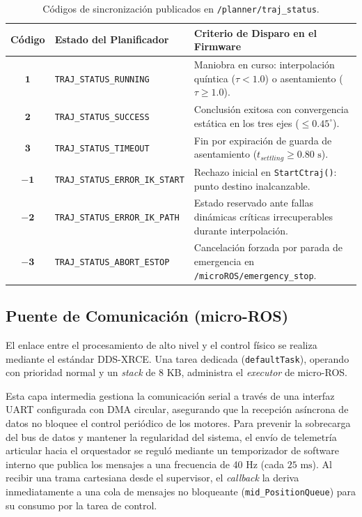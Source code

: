 \documentclass[12pt, a4paper]{report}
\begin{document}
\begin{table}[H]
\centering
\small
\begin{tabularx}{\linewidth}{|c|l|X|}
\hline
\textbf{Código} & \textbf{Estado del Planificador} & \textbf{Criterio de Disparo en el Firmware} \\
\hline
$\mathbf{1}$ & \texttt{TRAJ\_STATUS\_RUNNING} & Maniobra en curso: interpolación quíntica ($\tau < 1.0$) o asentamiento ($\tau \ge 1.0$). \\
\hline
$\mathbf{2}$ & \texttt{TRAJ\_STATUS\_SUCCESS} & Conclusión exitosa con convergencia estática en los tres ejes ($\le 0.45^\circ$). \\
\hline
$\mathbf{3}$ & \texttt{TRAJ\_STATUS\_TIMEOUT} & Fin por expiración de guarda de asentamiento ($t_{settling} \ge 0.80\text{ s}$). \\
\hline
$\mathbf{-1}$ & \texttt{TRAJ\_STATUS\_ERROR\_IK\_START} & Rechazo inicial en \texttt{StartCtraj()}: punto destino inalcanzable. \\
\hline
$\mathbf{-2}$ & \texttt{TRAJ\_STATUS\_ERROR\_IK\_PATH} & Estado reservado ante fallas dinámicas críticas irrecuperables durante interpolación. \\
\hline
$\mathbf{-3}$ & \texttt{TRAJ\_STATUS\_ABORT\_ESTOP} & Cancelación forzada por parada de emergencia en \texttt{/microROS/emergency\_stop}. \\
\hline
\end{tabularx}
\caption{Códigos de sincronización publicados en \texttt{/planner/traj\_status}.}
\label{tab:codigos_traj_status}
\end{table}

\subsection{Puente de Comunicación (micro-ROS)}
El enlace entre el procesamiento de alto nivel y el control físico se realiza mediante el estándar DDS-XRCE. Una tarea dedicada (\texttt{defaultTask}), operando con prioridad normal y un \textit{stack} de 8 KB, administra el \textit{executor} de micro-ROS.

Esta capa intermedia gestiona la comunicación serial a través de una interfaz UART configurada con DMA circular, asegurando que la recepción asíncrona de datos no bloquee el control periódico de los motores. Para prevenir la sobrecarga del bus de datos y mantener la regularidad del sistema, el envío de telemetría articular hacia el orquestador se reguló mediante un temporizador de software interno que publica los mensajes a una frecuencia de 40 Hz (cada $25\text{ ms}$). Al recibir una trama cartesiana desde el supervisor, el \textit{callback} la deriva inmediatamente a una cola de mensajes no bloqueante (\texttt{mid\_PositionQueue}) para su consumo por la tarea de control.
\end{document}

